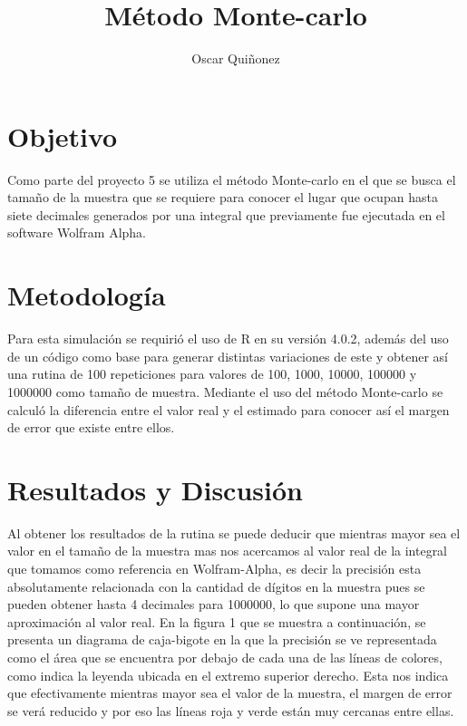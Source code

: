 \documentclass{article}
\title { M\'etodo Monte-carlo}
\author{Oscar Qui\~nonez}
\begin{document}
\maketitle
 
\section{Objetivo}\label{met}

Como parte del proyecto 5 se utiliza el m\'etodo Monte-carlo en el que se busca el tama\~no de la muestra que se requiere para conocer el lugar que ocupan hasta siete decimales generados por una integral que previamente fue ejecutada en el software Wolfram Alpha.

\section{Metodolog\'ia}\label{met}

Para esta simulaci\'on se requiri\'o el uso de R en su versi\'on 4.0.2, adem\'as del uso de un c\'odigo \cite{satuelisa} como base para generar distintas variaciones de este y obtener as\'i una rutina de 100 repeticiones para valores de 100, 1000, 10000, 100000 y 1000000 como tama\~no de muestra. Mediante el uso del m\'etodo Monte-carlo se calcul\'o la diferencia entre el valor real y el estimado para conocer as\'i el margen de error que existe entre ellos.

\section{Resultados y Discusi\'on}\label{res}

Al obtener los resultados de la rutina \cite{yo} se puede deducir que mientras mayor sea el valor en el tama\~no de la muestra mas nos acercamos al valor real de la integral que tomamos como referencia en Wolfram-Alpha, es decir la precisi\'on esta absolutamente relacionada con la cantidad de d\'igitos en la muestra pues se pueden obtener hasta 4 decimales para 1000000, lo que supone una mayor aproximaci\'on al valor real.
En la figura 1 que se muestra a continuaci\'on, se presenta un diagrama de caja-bigote en la que la precisi\'on se ve representada como el \'area que se encuentra por debajo de cada una de las l\'ineas de colores, como indica la leyenda ubicada en el extremo superior derecho. Esta nos indica que efectivamente mientras mayor sea el valor de la muestra, el margen de error se ver\'a reducido y por eso las l\'ineas roja y verde est\'an muy cercanas entre ellas.
\end{document}

